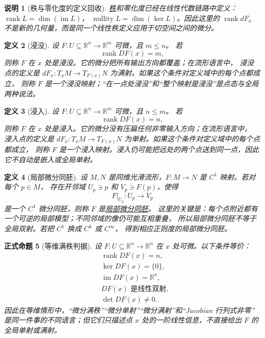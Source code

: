 \documentclass[UTF8,fontset=none,a4paper,11pt]{ctexart}
\theoremstyle{foundation-definition}
\newtheorem{definition}{定义}[section]
\theoremstyle{foundation-theorem}
\theoremstyle{foundation-proposition}
\newtheorem{proposition}[definition]{正式命题}
\theoremstyle{foundation-example}
\theoremstyle{foundation-remark}
\newtheorem{remark}[definition]{说明}
\theoremstyle{foundation-theorem}
\newcommand{\term}[2]{\hyperref[#1]{#2}}
\begin{document}
\begin{remark}[秩与零化度的定义回收]\label{rem:rank-nullity-recall}
\term{def:linear-rank}{秩}和零化度已经在线性代数链路中定义：
\(\operatorname{rank}L=\dim(\operatorname{im}L)\)，
\(\operatorname{nullity}L=\dim(\ker L)\)。因此这里的
\(\operatorname{rank}dF_x\) 不是新的几何量，而是同一个线性秩定义应用于切空间之间的微分。
\end{remark}

\begin{definition}[浸没]\label{def:submersion}
设 \(F:U\subseteq\mathbb R^n\to\mathbb R^m\) 可微，且 \(m\leq n\)。
若
\[
\operatorname{rank}DF(x)=m,
\]
则称 \(F\) 在 \(x\) 处是浸没。它的微分把所有输出方向都覆盖；在流形语言中，
浸没点的定义是 \(dF_x:T_xM\to T_{F(x)}N\) 为满射。如果这个条件对定义域中的每个点都成立，
则称 \(F\) 是一个浸没映射；“在一点处浸没”和“整个映射是浸没”是点态与全局两种说法。
\end{definition}

\begin{definition}[浸入]\label{def:immersion}
设 \(F:U\subseteq\mathbb R^n\to\mathbb R^m\) 可微，且 \(n\leq m\)。
若
\[
\operatorname{rank}DF(x)=n,
\]
则称 \(F\) 在 \(x\) 处是浸入。它的微分没有压扁任何非零输入方向；在流形语言中，
浸入点的定义是 \(dF_x:T_xM\to T_{F(x)}N\) 为单射。如果这个条件对定义域中的每个点都成立，
则称 \(F\) 是一个浸入映射。浸入仍可能把远处的两个点送到同一点，因此它不自动是嵌入或全局单射。
\end{definition}

\begin{definition}[局部微分同胚]\label{def:local-diffeomorphism}
设 \(M,N\) 是同维光滑流形，\(F:M\to N\) 是 \(C^1\) 映射。若对每个 \(p\in M\)，
存在开邻域 \(U_p\ni p\) 和 \(V_p\ni F(p)\)，使得
\[
F|_{U_p}:U_p\longrightarrow V_p
\]
是一个 \(C^1\) 微分同胚，则称 \(F\) 是\term{def:local-diffeomorphism}{局部微分同胚}。
这里的关键是：每个点附近都有一个可逆的局部模型；不同邻域的像仍可能互相重叠，
所以局部微分同胚不等于全局双射。若把 \(C^1\) 换成 \(C^k\) 或 \(C^\infty\)，
得到相应正则度的局部微分同胚。
\end{definition}

\begin{proposition}[等维满秩判据]\label{prop:equal-dimension-full-rank}
设 \(F:U\subseteq\mathbb R^n\to\mathbb R^n\) 在 \(x\) 处可微。以下条件等价：
\[
\begin{aligned}
&\operatorname{rank}DF(x)=n,\\
&\ker DF(x)=\{0\},\\
&\operatorname{im}DF(x)=\mathbb R^n,\\
&DF(x)\text{ 是线性双射},\\
&\det DF(x)\neq0.
\end{aligned}
\]
因此在等维情形中，“微分满秩”“微分单射”“微分满射”和“Jacobian 行列式非零”
是同一件事的不同语言；但它们只描述点 \(x\) 处的一阶线性信息，不直接给出 \(F\) 的全局单射或满射。
\end{proposition}
\end{document}
